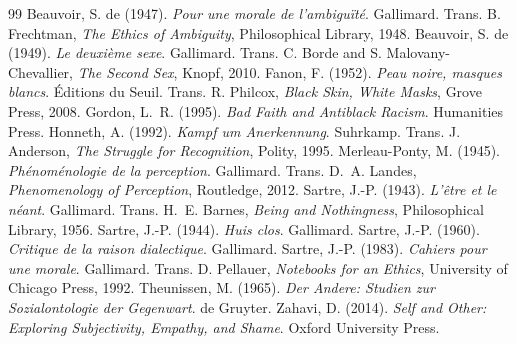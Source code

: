 \documentclass{situationist-preprint}
\begin{document}
\begin{thebibliography}{99}\small
{} Beauvoir, S. de (1947). \emph{Pour une morale de l'ambigu\"it\'e}. Gallimard. Trans. B. Frechtman, \emph{The Ethics of Ambiguity}, Philosophical Library, 1948.
 Beauvoir, S. de (1949). \emph{Le deuxi\`eme sexe}. Gallimard. Trans. C. Borde and S. Malovany-Chevallier, \emph{The Second Sex}, Knopf, 2010.
 Fanon, F. (1952). \emph{Peau noire, masques blancs}. \'Editions du Seuil. Trans. R. Philcox, \emph{Black Skin, White Masks}, Grove Press, 2008.
 Gordon, L.~R. (1995). \emph{Bad Faith and Antiblack Racism}. Humanities Press.
 Honneth, A. (1992). \emph{Kampf um Anerkennung}. Suhrkamp. Trans. J. Anderson, \emph{The Struggle for Recognition}, Polity, 1995.
 Merleau-Ponty, M. (1945). \emph{Ph\'enom\'enologie de la perception}. Gallimard. Trans. D.~A. Landes, \emph{Phenomenology of Perception}, Routledge, 2012.
 Sartre, J.-P. (1943). \emph{L'\^etre et le n\'eant}. Gallimard. Trans. H.~E. Barnes, \emph{Being and Nothingness}, Philosophical Library, 1956.
 Sartre, J.-P. (1944). \emph{Huis clos}. Gallimard.
 Sartre, J.-P. (1960). \emph{Critique de la raison dialectique}. Gallimard.
 Sartre, J.-P. (1983). \emph{Cahiers pour une morale}. Gallimard. Trans. D. Pellauer, \emph{Notebooks for an Ethics}, University of Chicago Press, 1992.
 Theunissen, M. (1965). \emph{Der Andere: Studien zur Sozialontologie der Gegenwart}. de Gruyter.
 Zahavi, D. (2014). \emph{Self and Other: Exploring Subjectivity, Empathy, and Shame}. Oxford University Press.
\end{thebibliography}
\end{document}
